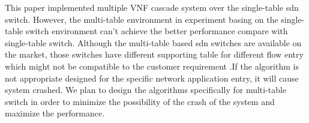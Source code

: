 \documentclass[conference]{IEEEtran}
\begin{document}
This paper implemented multiple VNF cascade system over the single-table sdn switch. However, the multi-table environment in experiment basing on the single-table switch environment can't achieve the better performance compare with single-table switch. Although the multi-table based sdn switches are available on the market, those switches have different supporting table for different flow entry which might not be compatible to the customer requirement .If the algorithm is not appropriate designed for the specific network application entry, it will cause system crashed. We plan to design the algorithms specifically for multi-table switch in order to minimize the possibility of the crash of the system and maximize the performance.



\end{document}
